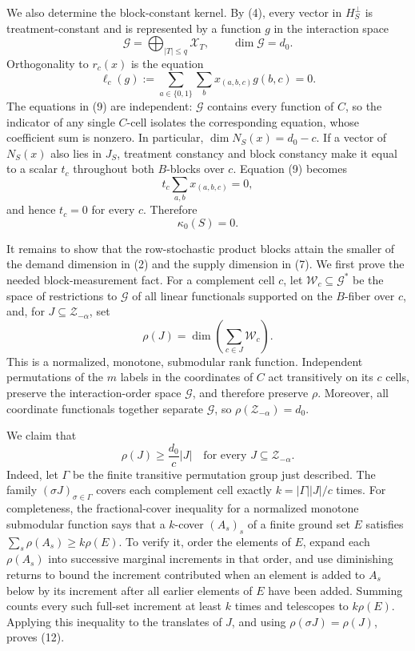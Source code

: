 We also determine the block-constant kernel.  By (4), every vector in
\(H_S^\perp\) is treatment-constant and is represented by a function
\(g\) in the interaction space
\[
\mathscr G=\bigoplus_{\lvert T\rvert\le q}\mathscr X_T,
\qquad \dim\mathscr G=d_0.
\tag{8}
\]
Orthogonality to \(r_c(x)\) is the equation
\[
\ell_c(g):=\sum_{a\in\{0,1\}}\sum_b x_{(a,b,c)}g(b,c)=0.
\tag{9}
\]
The equations in (9) are independent: \(\mathscr G\) contains every function
of \(C\), so the indicator of any single \(C\)-cell isolates the corresponding
equation, whose coefficient sum is nonzero.  In particular,
\(\dim N_S(x)=d_0-c\).  If a vector of \(N_S(x)\) also lies in \(J_S\), treatment
constancy and block constancy make it equal to a scalar \(t_c\) throughout both
\(B\)-blocks over \(c\).  Equation (9) becomes
\[
t_c\sum_{a,b}x_{(a,b,c)}=0,
\]
and hence \(t_c=0\) for every \(c\).  Therefore
\[
\kappa_0(S)=0.
\tag{10}
\]

It remains to show that the row-stochastic product blocks attain the smaller of
the demand dimension in (2) and the supply dimension in (7).  We first prove the
needed block-measurement fact.  For a complement cell \(c\), let
\(\mathscr W_c\subseteq\mathscr G^*\) be the space of restrictions to
\(\mathscr G\) of all linear functionals supported on the \(B\)-fiber over
\(c\), and, for \(J\subseteq\mathcal Z_{-\alpha}\), set
\[
\rho(J)=\dim\left(\sum_{c\in J}\mathscr W_c\right).
\tag{11}
\]
This is a normalized, monotone, submodular rank function.  Independent
permutations of the \(m\) labels in the coordinates of \(C\) act transitively
on its \(c\) cells, preserve the interaction-order space \(\mathscr G\), and
therefore preserve \(\rho\).  Moreover, all coordinate functionals together
separate \(\mathscr G\), so \(\rho(\mathcal Z_{-\alpha})=d_0\).

We claim that
\[
\rho(J)\ge \frac{d_0}{c}\lvert J\rvert
\quad\text{for every }J\subseteq\mathcal Z_{-\alpha}.
\tag{12}
\]
Indeed, let \(\Gamma\) be the finite transitive permutation group just
described.  The family \((\sigma J)_{\sigma\in\Gamma}\) covers each complement
cell exactly
\(k=\lvert\Gamma\rvert\lvert J\rvert/c\) times.  For completeness, the
fractional-cover inequality for a normalized monotone submodular function says
that a \(k\)-cover \((A_s)_s\) of a finite ground set \(E\) satisfies
\(\sum_s\rho(A_s)\ge k\rho(E)\).  To verify it, order the elements of \(E\),
expand each \(\rho(A_s)\) into successive marginal increments in that order,
and use diminishing returns to bound the increment contributed when an element
is added to \(A_s\) below by its increment after all earlier elements of \(E\)
have been added.  Summing counts every such full-set increment at least \(k\)
times and telescopes to \(k\rho(E)\).  Applying this inequality to the translates
of \(J\), and using \(\rho(\sigma J)=\rho(J)\), proves (12).

